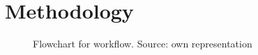 \chapter{Methodology}
\label{ch:methodology}
\begin{figure}[htbp]
    \centering
    
    \caption[Flowchart for workflow]{Flowchart for workflow. Source: own representation}
    \label{fig:Flowchart}
\end{figure}








